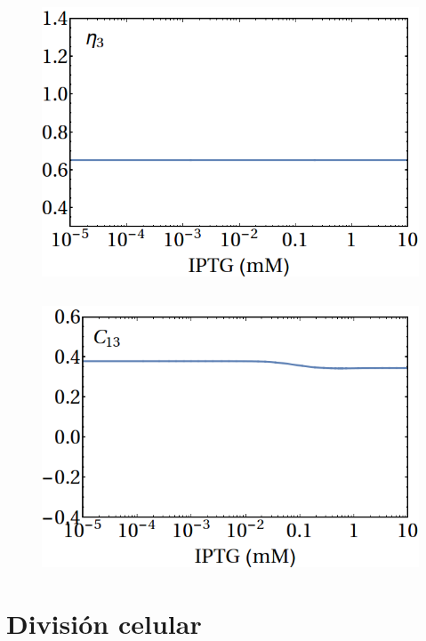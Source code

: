 \documentclass[xcolor=dvipsnames]{beamer}
\begin{document}
\begin{frame}
\begin{columns}[c]
\begin{figure}[p]
    \centering
    \includegraphics[width=\textwidth]{lan-eta3.png}
\end{figure}
\end{columns}
\begin{figure}[p]
    \centering
    \includegraphics[width=.5\textwidth]{lan-c13.png}\\
\end{figure}
\end{frame}

\section{Divisi\'on celular}
\end{document}
